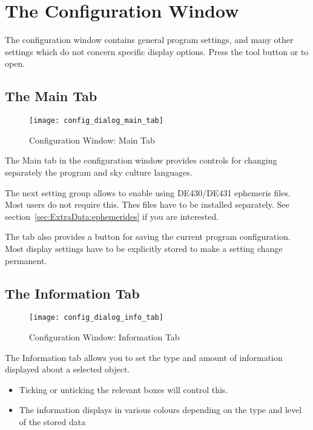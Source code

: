 \section{The Configuration Window}
\label{sec:gui:configuration}

The configuration window contains general program settings, and many
other settings which do not concern specific display options. Press
the tool button  or  to open.


\subsection{The Main Tab}
\label{sec:gui:configuration:main}


\begin{figure}[bp]
\centering\texttt{[image: config\_dialog\_main\_tab]}
\caption{Configuration Window: Main Tab}
\label{fig:gui:configuration:main}
\end{figure}

The Main tab in the configuration window provides controls for
changing separately the program and sky culture languages.

The next setting group allows to enable using DE430/DE431 ephemeris
files. Most users do not require this. Thes files have to be installed
separately. See section~\ref{sec:ExtraData:ephemerides} if you are
interested.

The tab also provides a button for saving the current program
configuration. Most display settings have to be explicitly stored to
make a setting change permanent.

\subsection{The Information Tab}
\label{sec:gui:configuration:info}


\begin{figure}[p]
\centering\texttt{[image: config\_dialog\_info\_tab]}
\caption{Configuration Window: Information Tab}
\label{fig:gui:configuration:info}
\end{figure}

The Information tab allows you to set the type and amount of information
displayed about a selected object.
\begin{itemize}
\item Ticking or unticking the relevant boxes will control this.
\item The information displays in various colours depending on the type and
level of the stored data
\end{itemize}

